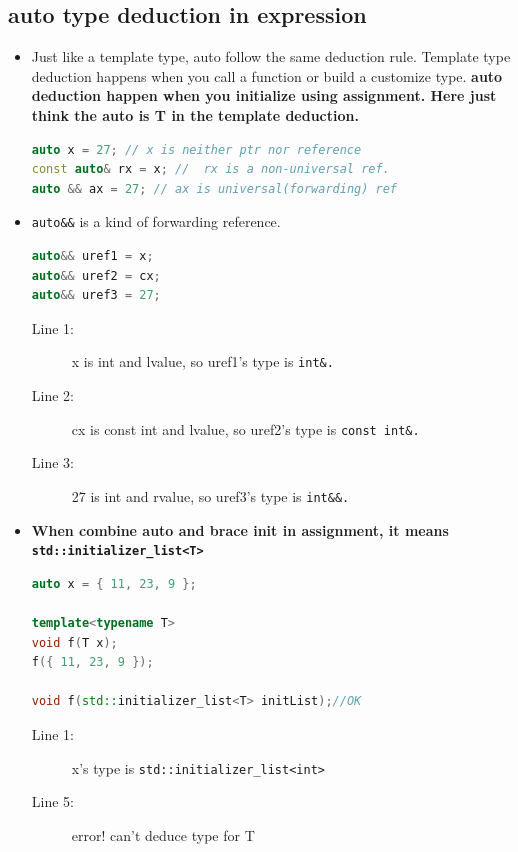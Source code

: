 \documentclass[a4paper,11pt,twoside]{book}
\begin{document}
\subsection{auto type deduction in expression}
\begin{itemize}
	\item Just like a template type, auto follow the same deduction rule. Template type deduction happens when you call a function or build a customize type. \textbf{auto deduction happen when you initialize using assignment. Here just think the auto is T in the template deduction.}
	
\begin{lstlisting}[frame=single, language=c++]
auto x = 27; // x is neither ptr nor reference
const auto& rx = x; //  rx is a non-universal ref.
auto && ax = 27; // ax is universal(forwarding) ref
\end{lstlisting}

    \item \texttt{auto\&\&} is a kind of forwarding reference.
\begin{lstlisting}[frame=single, language=c++]
auto&& uref1 = x; 
auto&& uref2 = cx; 
auto&& uref3 = 27; 
\end{lstlisting}
\begin{description}
	\item[Line 1:] x is int and lvalue, so uref1's type is \texttt{int\&.}
	\item[Line 2:] cx is const int and lvalue, so uref2's type is \texttt{const int\&.}
	\item[Line 3:] 27 is int and rvalue, so uref3's type is \texttt{int\&\&.}
\end{description}

	\item \textbf{When combine auto and brace init in assignment, it means \texttt{std::initializer\_list<T>}}
	
\begin{lstlisting}[frame=single, language=c++]
auto x = { 11, 23, 9 }; 

template<typename T> 
void f(T x);
f({ 11, 23, 9 }); 
	
void f(std::initializer_list<T> initList);//OK
\end{lstlisting}
\begin{description}
	\item[Line 1:] x's type is  \texttt{std::initializer\_list<int>}
	\item[Line 5:] error! can't deduce type for T
\end{description}


\end{itemize}
\end{document}
